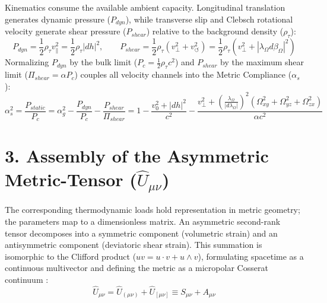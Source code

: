 Kinematics consume the available ambient capacity. Longitudinal translation generates dynamic pressure ($P_{dyn}$), while transverse slip and Clebsch rotational velocity generate shear pressure ($P_{shear}$) relative to the background density ($\rho_\tau$): %
\begin{equation}
    P_{dyn} = \frac{1}{2} \rho_\tau v_\parallel^2 = \frac{1}{2} \rho_\tau |dh|^2, \qquad P_{shear} = \frac{1}{2} \rho_\tau \left( v_\perp^2 + v_\circlearrowleft^2 \right) = \frac{1}{2} \rho_\tau \left( v_\perp^2 + |\lambda_\Omega d\beta_\Omega|^2 \right) \label{eq:tensor_pdyn} %
\end{equation}
Normalizing $P_{dyn}$ by the bulk limit ($P_c = \frac{1}{2}\rho_\tau c^2$) and $P_{shear}$ by the maximum shear limit ($\Pi_{shear} = \alpha P_c$) couples all velocity channels into the Metric Compliance ($\alpha_s$): %
\begin{equation} %
    \alpha_s^2 = \frac{P_{static}}{P_c} = \alpha_g^2 - \frac{P_{dyn}}{P_c} - \frac{P_{shear}}{\Pi_{shear}} = 1 - \frac{v_0^2 + |dh|^2}{c^2} - \frac{v_\perp^2 + \left(\frac{\lambda_\Omega}{|d\lambda_\Omega|}\right)^2 \left(\Omega_{xy}^2 + \Omega_{yz}^2 + \Omega_{zx}^2\right)}{\alpha c^2} \label{eq:tensor_alpha_s} %
\end{equation} %

\section*{3. Assembly of the Asymmetric Metric-Tensor ($\hat{U}_{\mu\nu}$)}
The corresponding thermodynamic loads hold representation in metric geometry; the parameters map to a dimensionless matrix. An asymmetric second-rank tensor decomposes into a symmetric component (volumetric strain) and an antisymmetric component (deviatoric shear strain). This summation is isomorphic to the Clifford product ($uv = u \cdot v + u \wedge v$), formulating spacetime as a continuous multivector and defining the metric as a micropolar Cosserat continuum \cite{Cosserat1909, Gurtin1981, Eringen1999}: 
\begin{equation}
    \hat{U}_{\mu\nu} = \hat{U}_{(\mu\nu)} + \hat{U}_{[\mu\nu]} \equiv S_{\mu\nu} + A_{\mu\nu} \label{eq:tensor_decomposition}
\end{equation}

